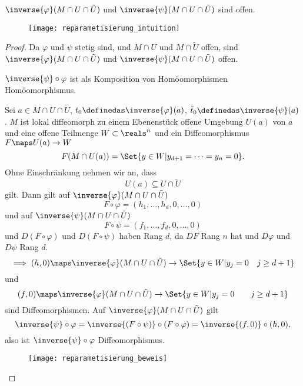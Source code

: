 \begin{bemerkungen*}
  \( \inverse{\varphi}(M\cap U\cap \tilde{U}) \) und \( \inverse{\psi}(M\cap U\cap \tilde{U}) \) sind offen.
\end{bemerkungen*}
\begin{figure}[H]
  \centering
  \texttt{[image: reparametisierung\_intuition]}
  \label{fig:reparametisierung_intuition}
\end{figure}
\begin{proof}
  Da \( \varphi \) und \( \psi \) stetig sind, und \( M\cap U \) und \( M\cap \tilde{U} \) offen, sind \( \inverse{\varphi}(M\cap U\cap \tilde{U}) \) und \( \inverse{\psi}(M\cap U\cap \tilde{U}) \) offen.
  
  \( \inverse{\psi}\circ \varphi \) ist als Komposition von Homöomorphismen Homöomorphismus.

  Sei \( a\in M\cap U\cap \tilde{U} \), \( t_0\definedas \inverse{\varphi}(a) \), \( \tilde{t}_0\definedas \inverse{\psi}(a) \). \( M \) ist lokal diffeomorph zu einem Ebenenstück \timplies \texists  offene Umgebung \( U(a) \) von \( a \) und eine offene Teilmenge \( W\subset \reals^n \) \sd und ein Diffeomorphismus \( 
    F\maps U(a)\to W \) \sd
    \begin{equation*}
      F(M\cap U(a))=\Set{y\in W|y_{d+1}=\dotsb=y_n=0}.
    \end{equation*}
  Ohne Einschränkung nehmen wir an, dass 
  \begin{equation*}
    U(a)\subseteq U\cap \tilde{U}
  \end{equation*}
  gilt. Dann gilt auf \( \inverse{\varphi}(M\cap U\cap \tilde{U}) \)
  \begin{equation*}
    F\circ \varphi=(h_1,\dotsc,h_d,0,\dotsc,0)
  \end{equation*}
  und auf \( \inverse{\psi}(M\cap U\cap \tilde{U}) \)
  \begin{equation*}
    F\circ \psi=(f_1,\dotsc,f_d,0,\dotsc,0)
  \end{equation*}
  und \( D(F\circ \varphi) \) und \( D(F\circ \psi) \) haben Rang \( d \), da \( DF \) Rang \( n \) hat und \( D\varphi \) und \( D\psi \) Rang \( d \).
  \begin{equation*}
    \implies (h,0)\maps \inverse{\varphi}(M\cap U\cap \tilde{U})\to \Set{y\in W|y_j=0\quad j\geq d+1}
  \end{equation*}
  und
  \begin{equation*}
    (f,0)\maps \inverse{\varphi}(M\cap U\cap \tilde{U})\to \Set{y\in W|y_j=0\qquad j\geq d+1}
  \end{equation*}
  sind Diffeomorphismen. Auf \( \inverse{\varphi}(M\cap U\cap \tilde{U}) \) gilt
  \begin{equation*}
    \inverse{\psi}\circ \varphi=\inverse{(F\circ \psi)}\circ (F\circ \varphi)=\inverse{(f,0)}\circ (h,0),
  \end{equation*}
  also ist \( \inverse{\psi}\circ \varphi \) Diffeomorphismus.
  \begin{figure}[H]
    \centering
    \texttt{[image: reparametisierung\_beweis]}
    \label{fig:reparametisierung_beweis}
  \end{figure}
\end{proof}
